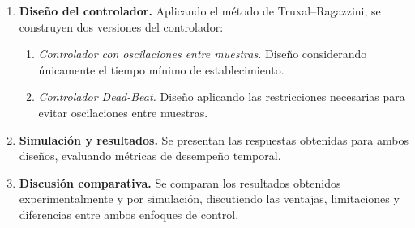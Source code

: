 \begin{enumerate}
	\item \textbf{Diseño del controlador.}  
	Aplicando el método de Truxal--Ragazzini, se construyen dos versiones del controlador:
	\begin{enumerate}
		\item \emph{Controlador con oscilaciones entre muestras.}  
		Diseño considerando únicamente el tiempo mínimo de establecimiento.
		
		\item \emph{Controlador Dead-Beat.}  
		Diseño aplicando las restricciones necesarias para evitar oscilaciones entre muestras.
	\end{enumerate}
	
	\item \textbf{Simulación y resultados.}  
	Se presentan las respuestas obtenidas para ambos diseños, evaluando métricas de desempeño temporal.
	
	\item \textbf{Discusión comparativa.}  
	Se comparan los resultados obtenidos experimentalmente y por simulación, discutiendo las ventajas, limitaciones y diferencias entre ambos enfoques de control.
\end{enumerate}
